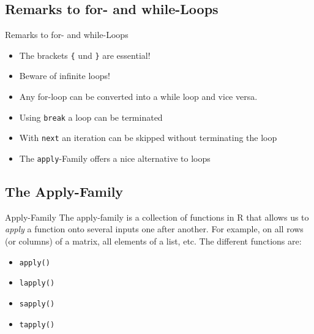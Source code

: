 \documentclass[xcolor=dvipsnames, aspectratio = 169]{beamer}
\begin{document}
\subsection*{Remarks to for- and while-Loops}

\begin{frame}[fragile]{Remarks to for- and while-Loops}
  \begin{itemize}
    \item The brackets \verb+{+ und \verb+}+ are essential!
    \item Beware of infinite loops!
    \item Any for-loop can be converted into a while loop and vice versa.
    \item Using \verb+break+ a loop can be terminated
    \item With \verb+next+ an iteration can be skipped without terminating the loop
    \item The \verb+apply+-Family offers a nice alternative to loops
    \end{itemize}
\end{frame}

\subsection*{The Apply-Family}

\begin{frame}[fragile]{Apply-Family}
	The apply-family is a collection of functions in R that allows us to \textit{apply} a function onto several inputs one after another. For example, on all rows (or columns) of a matrix, all elements of a list, etc. The different functions are:
	\begin{itemize}
		\item \verb+apply()+
		\item \verb+lapply()+
		\item \verb+sapply()+
		\item \verb+tapply()+
	\end{itemize}
\end{frame}
\end{document}
